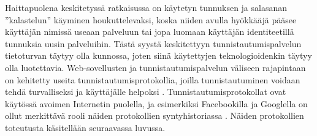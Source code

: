 Haittapuolena keskitetyssä ratkaisussa on käytetyn tunnuksen ja salasanan ''kalastelun'' käyminen houkuttelevaksi, koska niiden avulla hyökkääjä pääsee käyttäjän nimissä useaan palveluun tai jopa luomaan käyttäjän identiteetillä tunnuksia uusin palveluihin. Tästä syystä keskitettyyn tunnistautumispalvelun tietoturvan täytyy olla kunnossa, joten siinä käytettyjen teknologioidenkin täytyy olla luotettavia. Web-sovellusten ja tunnistautumispalvelun väliseen rajapintaan on kehitetty useita tunnistautumisprotokollia, joilla tunnistautuminen voidaan tehdä turvalliseksi ja käyttäjälle helpoksi \cite{open_identity}. Tunnistautumisprotokollat ovat käytössä avoimen Internetin puolella, ja esimerkiksi Facebookilla ja Googlella on ollut merkittävä rooli näiden protokollien syntyhistoriassa \cite{open_identity}. Näiden protokollien toteutusta käsitellään seuraavassa luvussa.